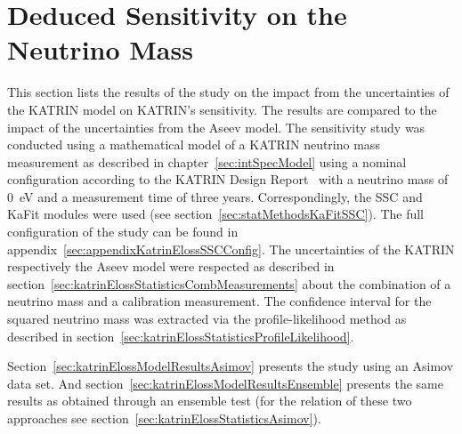 \section{Deduced Sensitivity on the Neutrino Mass}
\label{sec:katrinElossModelResults}
This section lists the results of the study on the impact from the uncertainties of the KATRIN model on KATRIN's sensitivity. The results are compared to the impact of the uncertainties from the Aseev model. The sensitivity study was conducted using a mathematical model of a KATRIN neutrino mass measurement as described in chapter~\ref{sec:intSpecModel} using a nominal configuration according to the KATRIN Design Report~\cite{Angrik:2005ep} with a neutrino mass of \SI{0}{eV} and a measurement time of three years. Correspondingly, the SSC and KaFit modules were used (see section~\ref{sec:statMethodsKaFitSSC}). The full configuration of the study can be found in appendix~\ref{sec:appendixKatrinElossSSCConfig}. The uncertainties of the KATRIN respectively the Aseev model were respected as described in section~\ref{sec:katrinElossStatisticsCombMeasurements} about the combination of a neutrino mass and a calibration measurement. The confidence interval for the squared neutrino mass was extracted via the profile-likelihood method as described in section~\ref{sec:katrinElossStatisticsProfileLikelihood}.

Section~\ref{sec:katrinElossModelResultsAsimov} presents the study using an Asimov data set. And section~\ref{sec:katrinElossModelResultsEnsemble} presents the same results as obtained through an ensemble test (for the relation of these two approaches see section~\ref{sec:katrinElossStatisticsAsimov}).
